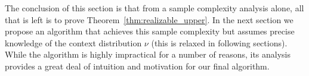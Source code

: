 \documentclass{article}
\newcommand{\zhaoqi}[1]{\textcolor{orange}{ZL:#1}}
\newcommand{\1}{\mathbf{1}}
\begin{document}
The conclusion of this section is that from a sample complexity analysis alone, all that is left is to prove Theorem~\ref{thm:realizable_upper}.
In the next section we propose an algorithm that achieves this sample complexity but assumes precise knowledge of the context distribution $\nu$ (this is relaxed in following sections).
While the algorithm is highly impractical for a number of reasons, its analysis provides a great deal of intuition and motivation for our final algorithm.

 

\end{document}
